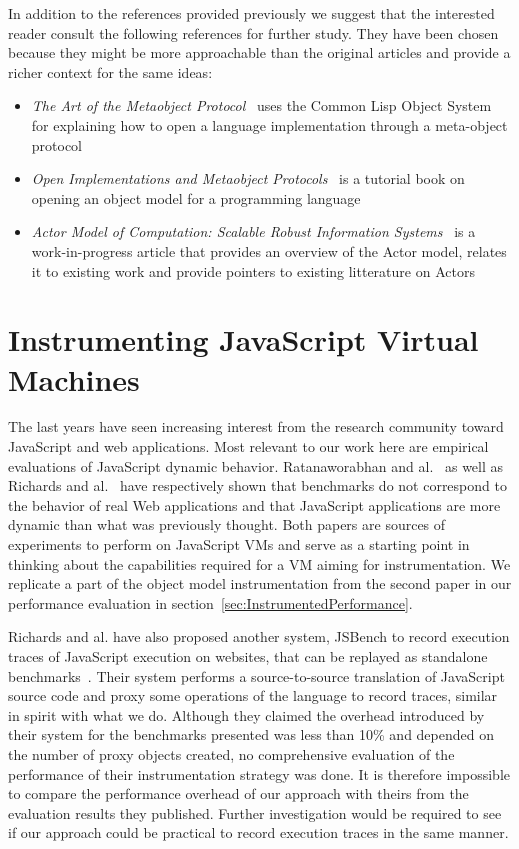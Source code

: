 In addition to the references provided previously we suggest that the
interested reader consult the following references for further study. They have
been chosen because they might be more approachable than the original articles
and provide a richer context for the same ideas:
\begin{itemize}
    \item \textit{The Art of the Metaobject Protocol}~\cite{Kiczales:1991} uses
        the Common Lisp Object System for explaining how to open a
        language implementation through a meta-object protocol
    \item \textit{Open Implementations and Metaobject
        Protocols}~\cite{Kickzales:1996} is a tutorial book on opening an object
        model for a programming language
    \item \textit{Actor Model of Computation: Scalable Robust Information
        Systems}~\cite{DBLP:journals/corr/abs-1008-1459} is a work-in-progress
        article that provides an overview of the Actor model, relates it to
        existing work and provide pointers to existing litterature on Actors 
\end{itemize}

\section{Instrumenting JavaScript Virtual Machines}
The last years have seen increasing interest from the research community toward
JavaScript and web applications. Most relevant to our work here are empirical
evaluations of JavaScript dynamic behavior. Ratanaworabhan and
al.~\cite{jsmeter} as well as Richards and al.~\cite{behavior_js} have
respectively shown that benchmarks do not correspond to the behavior of real
Web applications and that JavaScript applications are more dynamic than what
was previously thought. Both papers are sources of experiments to perform on
JavaScript VMs and serve as a starting point in thinking about the capabilities
required for a VM aiming for instrumentation. We replicate a part of the object
model instrumentation from the second paper in our performance evaluation in
section~\ref{sec:InstrumentedPerformance}.

Richards and al. have also proposed another system, JSBench to record execution
traces of JavaScript execution on websites, that can be replayed as standalone
benchmarks~\cite{Richards:2011}. Their system performs a source-to-source
translation of JavaScript source code and proxy some operations of the language
to record traces, similar in spirit with what we do. Although they claimed the
overhead introduced by their system for the benchmarks presented was less than
10\% and depended on the number of proxy objects created, no comprehensive
evaluation of the performance of their instrumentation strategy was done. It is
therefore impossible to compare the performance overhead of our approach with
theirs from the evaluation results they published. Further investigation would
be required to see if our approach could be practical to record execution
traces in the same manner.

